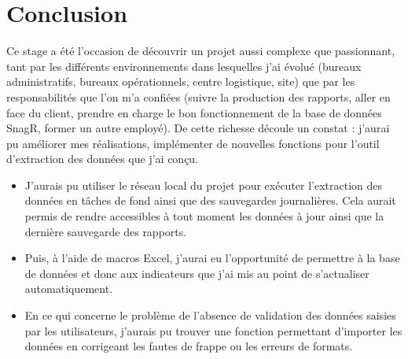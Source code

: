 \chapter*{Conclusion}



Ce stage a été l'occasion de découvrir un projet aussi complexe que passionnant, tant par les différents environnements dans lesquelles j'ai évolué (bureaux administratifs, bureaux opérationnels, centre logistique, site) que par les responsabilités que l'on m’a confiées (suivre la production des rapports, aller en face du client, prendre en charge le bon fonctionnement de la base de données SnagR, former un autre employé).
De cette richesse découle un constat : j'aurai pu améliorer mes réalisations, implémenter de nouvelles fonctions pour l'outil d'extraction des données que j'ai conçu.

\begin{itemize}
\item J'aurais pu utiliser le réseau local du projet pour exécuter l'extraction des données en tâches de fond ainsi que des sauvegardes journalières. Cela aurait permis de rendre accessibles à tout moment les données à jour ainsi que la dernière sauvegarde des rapports.
\item Puis, à l'aide de macros Excel, j'aurai eu l'opportunité de permettre à la base de données et donc aux indicateurs que j'ai mis au point de s'actualiser automatiquement.
\item En ce qui concerne le problème de l'absence de validation des données saisies par les utilisateurs, j'aurais pu trouver une fonction permettant d'importer les données en corrigeant les fautes de frappe ou les erreurs de formats.
\end{itemize}

